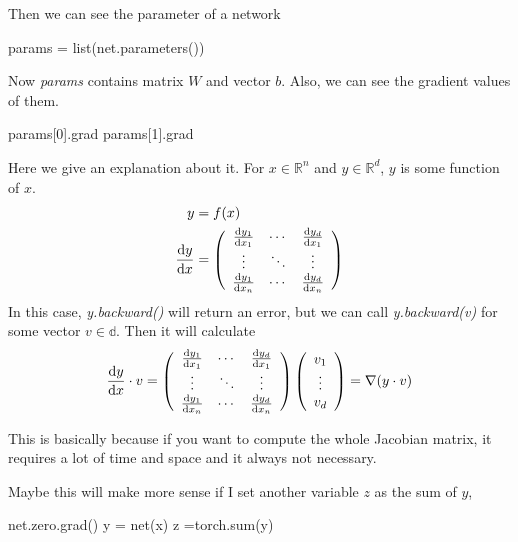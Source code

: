 Then we can see the parameter of a network 
\begin{python}
params = list(net.parameters())
\end{python}
Now \emph{params} contains matrix $W$ and vector $b$. Also, we can see the gradient values of them. 
\begin{python}
params[0].grad
params[1].grad
\end{python}

Here we give an explanation about it. For $x\in\mathbb{R}^n$ and $y\in\mathbb{R}^d$, $y$ is some function of $x$.
\begin{equation}
\begin{split}
y &= f(x) \\
\frac{{\rm d} y}{{\rm d} x} &= \left(\begin{array}{ccc} 
	\frac{{\rm d} y_1}{{\rm d} x_1} &\cdots &\frac{{\rm d} y_d}{{\rm d} x_1} \\
	\vdots &\ddots &\vdots \\
	\frac{{\rm d} y_1}{{\rm d} x_n} &\cdots &\frac{{\rm d} y_d}{{\rm d} x_n}
	\end{array}\right)  
\end{split}
\end{equation}
In this case, \emph{y.backward()} will return an error, but we can call \emph{y.backward(v)} for some vector $v\in\mathbb{d}$. Then it will calculate 
\begin{equation}
\frac{{\rm d} y}{{\rm d} x}\cdot v = \left(\begin{array}{ccc} 
	\frac{{\rm d} y_1}{{\rm d} x_1} &\cdots &\frac{{\rm d} y_d}{{\rm d} x_1} \\
	\vdots &\ddots &\vdots \\
	\frac{{\rm d} y_1}{{\rm d} x_n} &\cdots &\frac{{\rm d} y_d}{{\rm d} x_n}
	\end{array}\right)  
	\left(\begin{array}{c} 
	v_1 \\ \vdots \\v_d	
	\end{array}\right)  
= \nabla(y\cdot v)
\end{equation}


This is basically because if you want to compute the whole Jacobian matrix, it requires a lot of time and space and it always not necessary. 

Maybe this will make more sense if I set another variable $z$ as the sum of $y$, 
\begin{python}
net.zero.grad()
y = net(x)
z =torch.sum(y)
\end{python}

